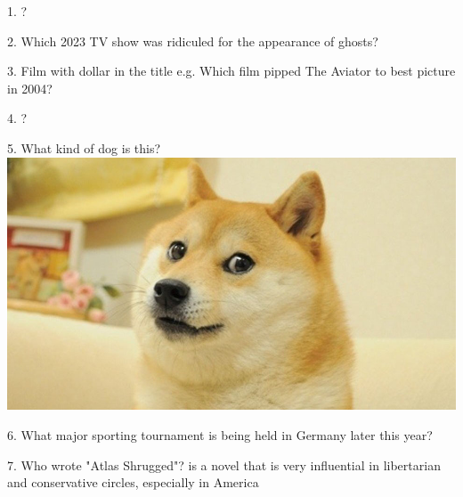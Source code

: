 \begin{frame}
\begin{center}
\Large
1. ?
\end{center}
\end{frame}
\begin{frame}
\begin{center}
\Large
2. Which 2023 TV show was ridiculed for the appearance of ghosts?
\end{center}
\end{frame}
\begin{frame}
\begin{center}
\Large
3. Film with dollar in the title e.g. Which film pipped The Aviator to best picture in 2004?
\end{center}
\end{frame}
\begin{frame}
\begin{center}
\Large
4. ?
\end{center}
\end{frame}
\begin{frame}
\begin{center}
\Large
5. What kind of dog is this?
\\
\vspace{0.5em}\includegraphics[height=0.6\paperheight]{images/doge.jpg}
\end{center}
\end{frame}
\begin{frame}
\begin{center}
\Large
6. What major sporting tournament is being held in Germany later this year?
\end{center}
\end{frame}
\begin{frame}
\begin{center}
\Large
7. Who wrote "Atlas Shrugged"? is a novel that is very influential in libertarian and conservative circles, especially in America
\end{center}
\end{frame}

